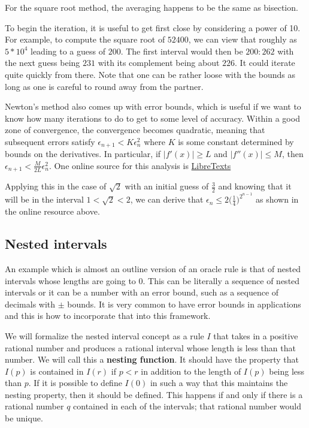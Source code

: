 \documentclass[12pt]{article}
\theoremstyle{remark}
\begin{document}
For the square root method, the averaging happens to be the same as bisection. 

To begin the iteration, it is useful to get first close by considering a power of 10. For example, to compute the square root of $52400$, we can view that roughly as $5*10^4$ leading to a guess of $200$. The first interval would then be $200:262$ with the next guess being $231$ with its complement being about $226$. It could iterate quite quickly from there. Note that one can be rather loose with the bounds as long as one is careful to round away from the partner.  

Newton's method also comes up with error bounds, which is useful if we want to know how many iterations to do to get to some level of accuracy. Within a good zone of convergence, the convergence becomes quadratic, meaning that subsequent errors satisfy $\epsilon_{n+1} < K \epsilon_n^2$ where $K$ is some constant determined by bounds on the derivatives. In particular, if $|f'(x)| \geq L$ and $|f''(x)| \leq M$, then $\epsilon_{n+1} < \frac{M}{2L} \epsilon_n^2$. One online source for this analysis is \href{https://math.libretexts.org/Bookshelves/Calculus/CLP-1_Differential_Calculus_(Feldman_Rechnitzer_and_Yeager)/06\%3A_Appendix/6.03\%3A_C-_Root_Finding/6.3.02\%3A_C.2_The_Error_Behaviour_of_Newton's_Method}{LibreTexts}

Applying this in the case of $\sqrt{2}$ with an initial guess of $\frac{3}{2}$ and knowing that it will be in the interval $1 < \sqrt{2} < 2$, we can derive that $\epsilon_n \leq 2 \big(\frac{1}{4}\big)^{2^{n-1}}$ as shown in the online resource above. 


\subsection{Nested intervals} \label{sec:ni}

An example which is almost an outline version of an oracle rule is that of nested intervals whose lengths are going to 0. This can be literally a sequence of nested intervals or it can be a number with an error bound, such as a sequence of decimals with $\pm$ bounds. It is very common to have error bounds in applications and this is how to incorporate that into this framework. 

We will formalize the nested interval concept as a rule $I$ that takes in a positive rational number and produces a rational interval whose length is less than that number. We will call this a \textbf{nesting function}. It should have the property that $I(p)$ is contained in $I(r)$ if $p<r$ in addition to the length of $I(p)$ being less than $p$. If it is possible to define $I(0)$ in such a way that this maintains the nesting property, then it should be defined. This happens if and only if there is a rational number $q$ contained in each of the intervals; that rational number would be unique. 
\end{document}

